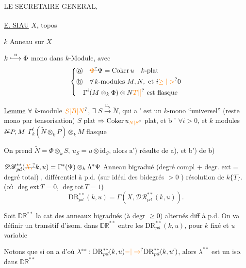 LE SECRETAIRE GENERAL,\\
\\
\uline{E. SIAU}
$X$, topos

$k$ Anneau sur $X$

$k\overset{u}{\lhook\joinrel\longrightarrow}\Phi$ mono dans $k$-Module, avec
\[
\left\{\begin{aligned}
&\text{\textcircled{a}}\quad \deleted{\unsure{\Phi}}\Psi=\operatorname{Coker}u\quad k\text{-plat}\\
&\text{\textcircled{b}}\quad\forall\, k\text{-modules }M,N,\ \text{et }i\unsure{\geq|>}0\\
&\hspace{1em}\Gamma^i(M\otimes_k\Phi)\otimes N\unsure{T|]}\ \text{est flasque}
\end{aligned}\right.
\]

\uline{Lemme} $\forall$ $k$-module $\unsure{S|B|N}$, $\exists$  $S\xrightarrow{u_S}\widetilde N$, qui \textcircled{a'} est un $k$-mono \textquotedblleft universel'' (reste mono par tensorisation)  $S$ plat $\Rightarrow\operatorname{Coker}u_{\unsure{N|S}}$ plat, et \textcircled{b'} $\forall i>0$, et $k$ modules $\deleted{N}P,M$ $\Gamma_k^i(\widetilde N\otimes_k P)\otimes_k M$ flasque

On prend $\widetilde N=\Phi\otimes_k S$, $u_S=u\otimes\mathrm{id}_S$, alors a') résulte de a), et b') de b)

$\mathscr{DR}^{**}_{pd}(\deleted{\unsure{X,}}k,u)=\Gamma^*(\Psi)\otimes_k\Lambda^*\Psi$ Anneau bigradué (degré compl + degr. ext = degré total) , différentiel à p.d. (sur idéal des bidegrés $>0$ )  résolution de $k\{T\}$. (où $\deg\mathrm{ext}\,T=0$, $\deg\mathrm{tot}\,T=1$)
\[
\mathrm{DR}_{pd}^{**}(k,u)=\Gamma(X,\mathscr{DR}_{pd}^{**}(k,u)).
\]

Soit $\mathbb{DR}^{**}$ la cat  des anneaux bigradués (à degr $\geq 0$) alternés diff à p.d.  On va définir un  transitif d'isom. dans $\mathbb{DR}^{**}$ entre les $\mathrm{DR}_{pd}^{**}(k,u)$, pour $k$ fixé et $u$ variable

Notons que si on a
d'où $\lambda^{**}:\mathrm{DR}_{pd}^{**}(k,u)\unsure{\mathord{-}|\to}\mathrm{DR}_{pd}^{**}(k,u')$, alors $\lambda^{**}$ est un iso. dans $\mathbb{DR}^{**}$

